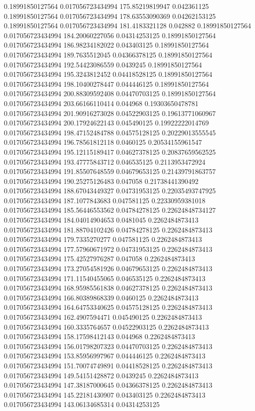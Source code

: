 0.18991850127564 0.017056723434994 175.85219819947 0.042361125
0.18991850127564 0.017056723434994 178.63553090369 0.04262153125
0.18991850127564 0.017056723434994 181.4183321128 0.042882
0.18991850127564 0.017056723434994 184.20060227056 0.04314253125
0.18991850127564 0.017056723434994 186.98234182022 0.043403125
0.18991850127564 0.017056723434994 189.7635512045 0.04366378125
0.18991850127564 0.017056723434994 192.54423086559 0.0439245
0.18991850127564 0.017056723434994 195.3243812452 0.04418528125
0.18991850127564 0.017056723434994 198.10400278447 0.044446125
0.18991850127564 0.017056723434994 200.88309592408 0.04470703125
0.18991850127564 0.017056723434994 203.66166110414 0.044968
0.19303650478781 0.017056723434994 201.90916273028 0.04522903125
0.19613771060967 0.017056723434994 200.17924622143 0.045490125
0.19922222014769 0.017056723434994 198.47152484788 0.04575128125
0.20229013555545 0.017056723434994 196.78561812118 0.0460125
0.20534155961547 0.017056723434994 195.12115189417 0.04627378125
0.20837659562525 0.017056723434994 193.47775843712 0.046535125
0.2113953472924 0.017056723434994 191.85507648559 0.04679653125
0.21439791863757 0.017056723434994 190.25275126483 0.047058
0.21738441390492 0.017056723434994 188.67043449327 0.04731953125
0.22035493747925 0.017056723434994 187.1077843683 0.047581125
0.22330959381018 0.017056723434994 185.56446553562 0.04784278125
0.22624848734127 0.017056723434994 184.04014904653 0.0481045
0.2262484873413 0.017056723434994 181.88704102426 0.04784278125
0.2262484873413 0.017056723434994 179.7335270277 0.047581125
0.2262484873413 0.017056723434994 177.57960671972 0.04731953125
0.2262484873413 0.017056723434994 175.42527976287 0.047058
0.2262484873413 0.017056723434994 173.27054581926 0.04679653125
0.2262484873413 0.017056723434994 171.11540455065 0.046535125
0.2262484873413 0.017056723434994 168.95985561838 0.04627378125
0.2262484873413 0.017056723434994 166.80389868339 0.0460125
0.2262484873413 0.017056723434994 164.64753340625 0.04575128125
0.2262484873413 0.017056723434994 162.4907594471 0.045490125
0.2262484873413 0.017056723434994 160.3335764657 0.04522903125
0.2262484873413 0.017056723434994 158.17598412143 0.044968
0.2262484873413 0.017056723434994 156.01798207323 0.04470703125
0.2262484873413 0.017056723434994 153.85956997967 0.044446125
0.2262484873413 0.017056723434994 151.70074749891 0.04418528125
0.2262484873413 0.017056723434994 149.54151428872 0.0439245
0.2262484873413 0.017056723434994 147.38187000645 0.04366378125
0.2262484873413 0.017056723434994 145.22181430907 0.043403125
0.2262484873413 0.017056723434994 143.06134685314 0.04314253125
